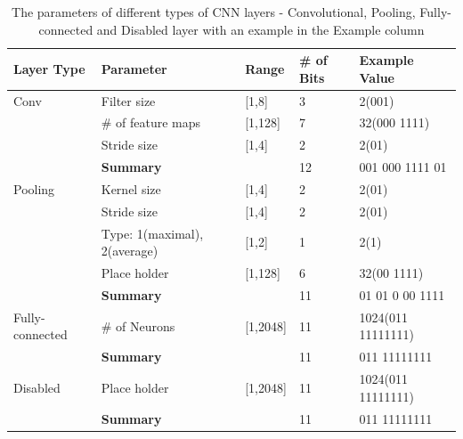 \documentclass[conference]{IEEEtran}
\begin{document}
\begin{table}[!t]
	\renewcommand{\arraystretch}{1.3}
	\caption{The parameters of different types of CNN layers - Convolutional, Pooling, Fully-connected and Disabled layer with an example in the Example column}
	\label{table:CNNFields}
	\centering
	\begin{tabular}{|p{1.5cm}|p{1.5cm}|p{1cm}|p{0.5cm}|p{2cm}|}
		\hline
		Layer Type & Parameter & Range & \# of Bits & Example Value\\
		\hline
		Conv & Filter size & [1,8] & 3 & 2(001)\\
		\hline
		& \# of feature maps & [1,128] & 7 & 32(000 1111)\\
		\hline
		& Stride size & [1,4] & 2 & 2(01)\\
		\hline
		& \textbf{Summary} &  & 12 & 001 000 1111 01\\
		\hline
		Pooling & Kernel size & [1,4] & 2 & 2(01)\\
		\hline
		& Stride size & [1,4] & 2 & 2(01)\\
		\hline
		& Type: 1(maximal), 2(average) & [1,2] & 1 & 2(1)\\
		\hline
		& Place holder & [1,128] & 6 & 32(00 1111)\\
		\hline
		& \textbf{Summary} &  & 11 & 01 01 0 00 1111\\
		\hline
		Fully-connected & \# of Neurons & [1,2048] & 11 & 1024(011 11111111)\\
		\hline
		& \textbf{Summary} &  & 11 & 011 11111111\\
		\hline
		Disabled & Place holder & [1,2048] & 11 & 1024(011 11111111)\\
		\hline
		& \textbf{Summary} &  & 11 & 011 11111111\\
		\hline
	\end{tabular}
\end{table}
\end{document}
